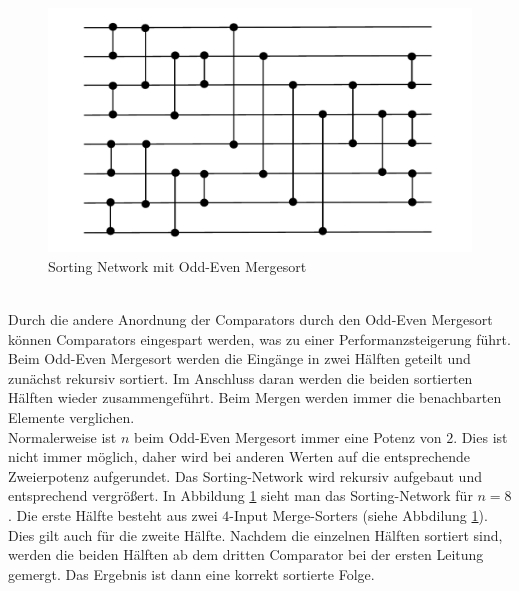 \documentclass[a4,abstract=on]{scrartcl}
\begin{document}
\begin{figure}[H]
\centering
\includegraphics[width=\textwidth]{sorting_network_odd_even.pdf}
\caption{Sorting Network mit Odd-Even Mergesort}
\label{fig:odd-even-mergesort}
\end{figure}
\ \\
Durch die andere Anordnung der Comparators durch den Odd-Even Mergesort können Comparators eingespart werden, was zu einer Performanzsteigerung führt. Beim Odd-Even Mergesort werden die Eingänge in zwei Hälften geteilt und zunächst rekursiv sortiert. Im Anschluss daran werden die beiden sortierten Hälften wieder zusammengeführt. Beim Mergen werden immer die benachbarten Elemente verglichen.\\
Normalerweise ist $n$ beim Odd-Even Mergesort immer eine Potenz von $2$. Dies ist nicht immer möglich, daher wird bei anderen Werten auf die entsprechende Zweierpotenz aufgerundet. Das Sorting-Network wird rekursiv aufgebaut und entsprechend vergrößert. In Abbildung \ref{fig:odd-even-mergesort} sieht man das Sorting-Network für $n=8$. Die erste Hälfte besteht aus zwei $4$-Input Merge-Sorters (siehe Abbdilung \ref{fig:odd-even-mergesort}). Dies gilt auch für die zweite Hälfte. Nachdem die einzelnen Hälften sortiert sind, werden die beiden Hälften ab dem dritten Comparator bei der ersten Leitung gemergt. Das Ergebnis ist dann eine korrekt sortierte Folge.

\end{document}
